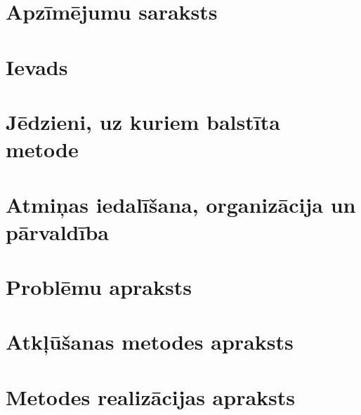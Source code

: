 \documentclass[12pt]{report}
\begin{document}

\setcounter{secnumdepth}{-1}

\clearpage


\tableofcontents
{}
\setcounter{page}{0}
\setcounter{secnumdepth}{-1}
\chapter{Apzīmējumu saraksts}



\setcounter{secnumdepth}{-1}
\chapter{Ievads}


\setcounter{secnumdepth}{2}
\setcounter{chapter}{0}
\chapter{Jēdzieni, uz kuriem balstīta metode}


\chapter{Atmiņas iedalīšana, organizācija un pārvaldība}\label{chap:chapter_2} %


\chapter{Problēmu apraksts}\label{chap:chapter_3} %


\chapter{Atkļūšanas metodes apraksts}\label{chap:chapter_4} %


\chapter{Metodes realizācijas apraksts}\label{chap:chapter_5}


%
%
%
%
%
%
%
%
\setcounter{secnumdepth}{-1}
\end{document}
